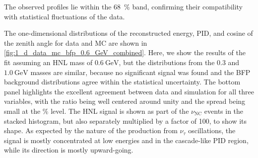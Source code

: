 \documentclass[
    aps,
    prd,
    reprint,
    amsmath,
    amssymb,
    nofootinbib,
    superscriptaddress,
    floatfix
]{revtex4-2}
\begin{document}
The observed profiles lie within the \SI{68}{\percent} band, confirming their compatibility with statistical fluctuations of the data.

The one-dimensional distributions of the reconstructed energy, PID, and cosine of the zenith angle for data and MC are shown in \cref{fig:1_d_data_mc_bfp_0.6_GeV_combined}.
Here, we show the results of the fit assuming an HNL mass of $\SI{0.6}\GeV$, but the distributions from the 0.3 and $\SI{1.0}\GeV$ masses are similar, because no significant signal was found and the BFP background distributions agree within the statistical uncertainty.
The bottom panel highlights the excellent agreement between data and simulation for all three variables, with the ratio being well centered around unity and the spread being small at the \si{\percent} level.
The HNL signal is shown as part of the $\nu_\mathrm{NC}$ events in the stacked histogram, but also separately multiplied by a factor of 100, to show its shape.
As expected by the nature of the production from $\nu_\tau$ oscillations, the signal is mostly concentrated at low energies and in the cascade-like PID region, while its direction is mostly upward-going.
\end{document}
